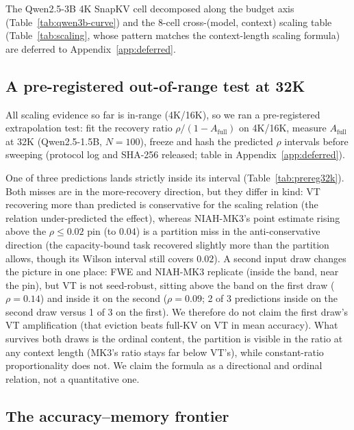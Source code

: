 \documentclass{article}
\begin{document}
The Qwen2.5-3B 4K SnapKV cell decomposed along the budget axis
(Table~\ref{tab:qwen3b-curve}) and the 8-cell cross-(model, context)
scaling table (Table~\ref{tab:scaling}, whose pattern matches the
context-length scaling formula) are deferred to
Appendix~\ref{app:deferred}.

\subsection{A pre-registered out-of-range test at 32K}
\label{subsec:prereg32k}

All scaling evidence so far is in-range (4K/16K), so we ran a pre-registered
extrapolation test: fit the recovery ratio $\rho / (1 - A_{\mathrm{full}})$ on
4K/16K, measure $A_{\mathrm{full}}$ at 32K (Qwen2.5-1.5B, $N = 100$), freeze and
hash the predicted $\rho$ intervals before sweeping (protocol log and SHA-256
released; table in Appendix~\ref{app:deferred}).

One of three predictions lands strictly inside its interval
(Table~\ref{tab:prereg32k}). Both misses are in the more-recovery
direction, but they differ in kind: VT recovering more than predicted is
conservative for the scaling relation (the relation under-predicted the
effect), whereas NIAH-MK3's point estimate rising above the $\rho \le 0.02$
pin (to $0.04$) is a partition miss in the anti-conservative direction (the
capacity-bound task recovered slightly more than the partition allows,
though its Wilson interval still covers $0.02$). A second input draw changes the picture in one place: FWE and NIAH-MK3
replicate (inside the band, near the pin), but VT is not seed-robust, sitting
above the band on the first draw ($\rho = 0.14$) and inside it on the second
($\rho = 0.09$; 2 of 3 predictions inside on the second draw versus 1 of 3 on
the first). We therefore do not claim the first draw's VT amplification (that
eviction beats full-KV on VT in mean accuracy). What survives both draws is the
ordinal content, the partition is visible in the ratio at any context length
(MK3's ratio stays far below VT's), while constant-ratio proportionality does
not. We claim the formula as a directional and ordinal relation, not a
quantitative one.

\subsection{The accuracy--memory frontier}
\label{subsec:pareto}
\end{document}
